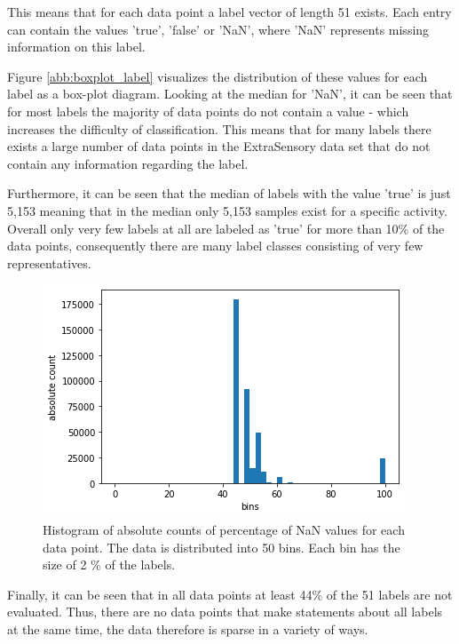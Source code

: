\newpage
This means that for each data point a label vector of length 51 exists. Each entry can contain the values 'true', 'false' or 'NaN', where 'NaN' represents missing information on this label.

Figure \ref{abb:boxplot_label} visualizes the distribution of these values for each label as a box-plot diagram. Looking at the median for 'NaN', it can be seen that for most labels the majority of data points do not contain a value - which increases the difficulty of classification. This means that for many labels there exists a large number of data points in the ExtraSensory data set that do not contain any information regarding the label.

Furthermore, it can be seen that the median of labels with the value 'true' is just 5,153 meaning that in the median only 5,153 samples exist for a specific activity. Overall only very few labels at all are labeled as 'true' for more than 10\% of the data points, consequently there are many label classes consisting of very few representatives. 

\begin{figure}[h]
	\begin{center}
		\includegraphics[scale=.8]{images/hist.png}
		\caption{Histogram of absolute counts of percentage of NaN values for each data point. The data is distributed into 50 bins. Each bin has the size of 2 \% of the labels.}
		\label{abb:histogramm_data}
	\end{center}		
\end{figure}

Finally, it can be seen that in all data points at least 44\% of the 51 labels are not evaluated. Thus, there are no data points that make statements about all labels at the same time, the data therefore is sparse in a variety of ways.
